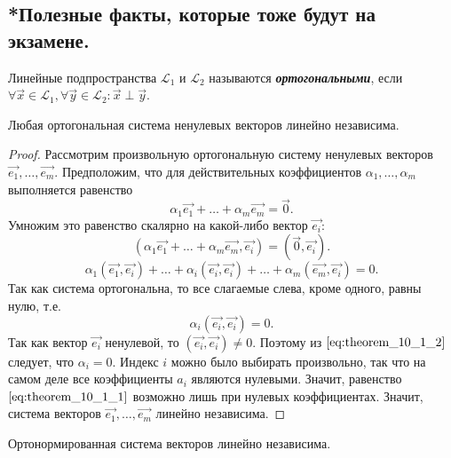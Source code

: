 \subsection{
    *Полезные факты, которые тоже будут на экзамене.
}

\begin{definition}
    Линейные подпространства $\mathcal{L}_1$ и $\mathcal{L}_2$ называются \textbf{\textit{ортогональными}}, если $\forall \vec{x} \in \mathcal{L}_1, \forall \vec{y} \in \mathcal{L}_2 \colon \vec{x} \perp \vec{y}$.
\end{definition}

\begin{theorem}
    Любая ортогональная система ненулевых векторов линейно независима.
\end{theorem}

\begin{proof}
    Рассмотрим произвольную ортогональную систему ненулевых векторов $\vec{e_1}, \ldots, \vec{e_m}$. Предположим, что для действительных коэффициентов $\alpha_1, \ldots, \alpha_m$ выполняется равенство
    \begin{equation}
        \alpha_1\vec{e_1} + \ldots + \alpha_m\vec{e_m} = \vec{0}.
        \label{eq:theorem_10_1_1}
    \end{equation}
    Умножим это равенство скалярно на какой-либо вектор $\vec{e_i}$:
    $$(\alpha_1\vec{e_1} + \ldots + \alpha_m\vec{e_m}, \vec{e_i}) = (\vec{0}, \vec{e_i}).$$
    $$\alpha_1(\vec{e_1}, \vec{e_i}) + \ldots + \alpha_i(\vec{e_i}, \vec{e_i}) + \ldots + \alpha_m(\vec{e_m}, \vec{e_i}) = 0.$$
    Так как система ортогональна, то все слагаемые слева, кроме одного, равны нулю, т.е.
    \begin{equation}
        \alpha_i(\vec{e_i}, \vec{e_i}) = 0.
        \label{eq:theorem_10_1_2}
    \end{equation}
    Так как вектор $\vec{e_i}$ ненулевой, то $(\vec{e_i}, \vec{e_i}) \ne 0$. Поэтому из $\eqref{eq:theorem_10_1_2}$ следует, что $\alpha_i = 0$. Индекс $i$ можно было выбирать произвольно, так что на самом деле все коэффициенты $a_i$ являются нулевыми. Значит, равенство $\eqref{eq:theorem_10_1_1}$ возможно лишь при нулевых коэффициентах. Значит, система векторов $\vec{e_1}, \ldots, \vec{e_m}$ линейно независима.
\end{proof}

\begin{corollary}
    Ортонормированная система векторов линейно независима. 
\end{corollary}

